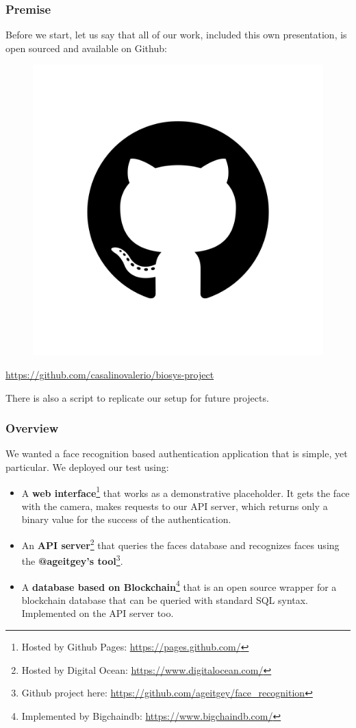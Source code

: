 \begin{frame} \frametitle{Premise}

	Before we start, let us say that all of our work, included this own presentation,
	is open sourced and available 
	on Github:
	
	\begin{center}
		\begin{figure}[H]
			\includegraphics[width=.3\textwidth]{img/github}
		\end{figure}
		{\color{red} \url{https://github.com/casalinovalerio/biosys-project}}
	\end{center}
	\vfill
	There is also a script to replicate our setup for future projects.
	
\end{frame}

\begin{frame} \frametitle{Overview}
We wanted a face recognition based authentication application that is simple, 
yet particular. We deployed our test using:

\begin{itemize}

	\item A \textbf{web interface}\footnote{Hosted by Github Pages: 
	{\color{red}\url{https://pages.github.com/}}} that works as a 
	demonstrative placeholder. It gets the face with the camera, makes 
	requests to our API server, which returns only a binary value for the 
	success of the authentication.
	
	\item An \textbf{API server}\footnote{Hosted by Digital Ocean: 
	{\color{red} \url{https://www.digitalocean.com/}}} that queries the 
	faces database and recognizes faces using the \textbf{@ageitgey's 
	tool}\footnote{Github project here: {\color{red} 
	\url{https://github.com/ageitgey/face_recognition}}}.
	
	\item A \textbf{database based on Blockchain}\footnote{Implemented by 
	Bigchaindb: {\color{red} \url{https://www.bigchaindb.com/}}} that is an
	open source wrapper for a blockchain database that can be queried with 
	standard SQL syntax. Implemented on the API server too.
	
\end{itemize}
\end{frame}

